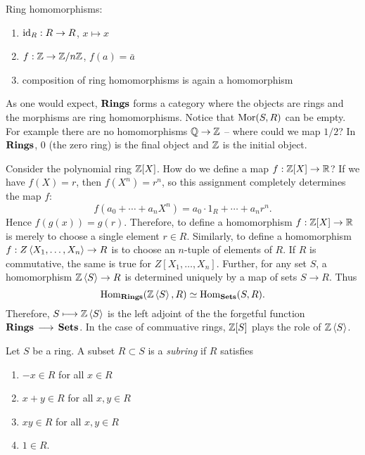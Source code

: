 \begin{eg}
  Ring homomorphisms:
  \begin{enumerate}
  \item $\mathrm{id}_R : R \to R$, $x \mapsto x$
  \item $f : \mathbb{Z} \to \mathbb{Z} / n \mathbb{Z}$, $f(a) = \bar a$
  \item composition of ring homomorphisms is again a homomorphism
  \end{enumerate}
\end{eg}

As one would expect, $\mathbf{Rings}$ forms a category where the objects are rings and the morphisms are ring homomorphisms. Notice that $\mathrm{Mor}(S,R)$ can be empty. For example there are no homomorphisms $\mathbb{Q} \to \mathbb{Z}$ -- where could we map $1/2$? In $\mathbf{Rings}$, $0$ (the zero ring) is the final object and $\mathbb{Z}$ is the initial object. 

Consider the polynomial ring $\mathbb{Z}[X]$. How do we define a map $f : \mathbb{Z}[X] \to \mathbb{R}$? If we have $f(X) = r$, then $f(X^n) = r^n$, so this assignment completely determines the map $f$:
\[
f(a_0 + \cdots + a_n X^n) = a_0 \cdot 1_R + \cdots + a_n r^n.
\]
Hence $f(g(x)) = g(r)$. Therefore, to define a homomorphism $f : \mathbb{Z}[X] \to \mathbb{R}$ is merely to choose a single element $r \in R$. Similarly, to define a homomorphism $f : Z\left\langle X_1, \ldots, X_n \right\rangle \to R$ is to choose an $n$-tuple of elements of $R$. If $R$ is commutative, the same is true for $Z[X_1, \ldots, X_n]$. Further, for any set $S$, a homomorphism $\mathbb{Z}\left\langle S \right\rangle \to R$ is determined uniquely by a map of sets $S \to R$. Thus
\[
\mathrm{Hom}_{\mathbf{Rings}}(\mathbb{Z}\left\langle S \right\rangle, R) \simeq \mathrm{Hom}_{\mathbf{Sets}}(S,R).
\]
Therefore, $S \longmapsto \mathbb{Z}\left\langle S \right\rangle$ is the left adjoint of the the forgetful function $\mathbf{Rings} \,\longrightarrow\, \mathbf{Sets}$. In the case of commuative rings, $\mathbb{Z}[S]$ plays the role of $\mathbb{Z}\left\langle S \right\rangle$.

\begin{dfn}
  Let $S$ be a ring. A subset $R \subset S$ is a \emph{subring} if $R$ satisfies
  \begin{enumerate}
  \item $-x \in R$ for all $x \in R$
  \item $x + y \in R$ for all $x,y \in R$
  \item $xy \in R$ for all $x, y \in R$
  \item $1 \in R$.
  \end{enumerate}
\end{dfn}

